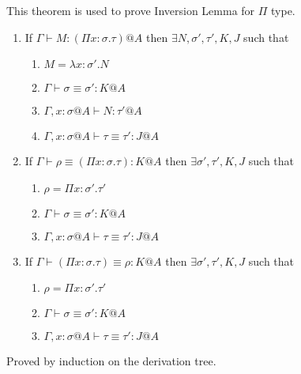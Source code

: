 \documentclass[9pt, a4paper]{extarticle}
\theoremstyle{break}
\newcommand{\G}{\Gamma}
\newcommand{\V}{\vdash}
\newcommand{\E}{\equiv}
\begin{document}
\begin{thm}
    This theorem is used to prove Inversion Lemma for $\Pi$ type.

    \begin{enumerate}
    \item If $\G \V M : (\Pi x:\sigma.\tau)@A$ then $\exists N, \sigma', \tau', K, J$ such that
    \begin{enumerate}
        \item $M = \lambda x:\sigma'.N$
        \item $\G \V \sigma \E \sigma' : K@A$
        \item $\G ,x:\sigma@A\V N:\tau'@A$
        \item $\G, x:\sigma@A\V \tau \E \tau' : J@A$
    \end{enumerate}
    \item If $\G \V \rho \E (\Pi x:\sigma.\tau) : K @A$ then $\exists \sigma', \tau', K, J$ such that
    \begin{enumerate}
        \item $\rho = \Pi x:\sigma'.\tau'$
        \item $\G \V \sigma \E \sigma' : K @A$
        \item $\G, x:\sigma@A\V \tau \E \tau' : J @A$
    \end{enumerate}
    \item If $\G \V (\Pi x:\sigma.\tau) \E \rho : K @A$ then $\exists \sigma', \tau', K, J$ such that
    \begin{enumerate}
        \item $\rho = \Pi x:\sigma'.\tau'$
        \item $\G \V \sigma \E \sigma' : K @A$
        \item $\G, x:\sigma@A\V \tau \E \tau' : J @A$
    \end{enumerate}
    \end{enumerate}
\end{thm}

Proved by induction on the derivation tree.
\end{document}
